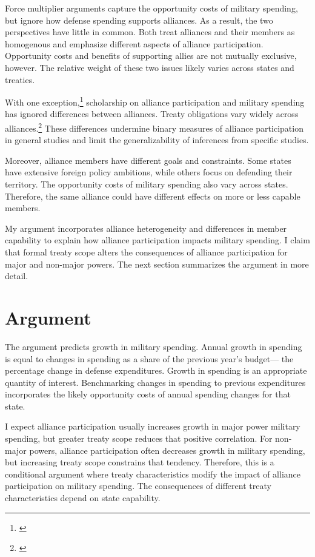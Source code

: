 \documentclass[12pt]{article}
\begin{document}
Force multiplier arguments capture the opportunity costs of military spending, but ignore how defense spending supports alliances. 
As a result, the two perspectives have little in common. 
Both treat alliances and their members as homogenous and emphasize different aspects of alliance participation. 
Opportunity costs and benefits of supporting allies are not mutually exclusive, however. 
The relative weight of these two issues likely varies across states and treaties. 


With one exception,\footnote{\cite{DigiuseppePoast2016}} scholarship on alliance participation and military spending has ignored differences between alliances.
Treaty obligations vary widely across alliances.\footnote{\cite{Leedsetal2002}}
These differences undermine binary measures of alliance participation in general studies and limit the generalizability of inferences from specific studies. 
 

Moreover, alliance members have different goals and constraints.
Some states have extensive foreign policy ambitions, while others focus on defending their territory. 
The opportunity costs of military spending also vary across states. 
Therefore, the same alliance could have different effects on more or less capable members. 


My argument incorporates alliance heterogeneity and differences in member capability to explain how alliance participation impacts military spending. 
I claim that formal treaty scope alters the consequences of alliance participation for major and non-major powers. 
The next section summarizes the argument in more detail. 



\section{Argument}

The argument predicts growth in military spending. 
Annual growth in spending is equal to changes in spending as a share of the previous year's budget--- the percentage change in defense expenditures. 
Growth in spending is an appropriate quantity of interest. 
Benchmarking changes in spending to previous expenditures incorporates the likely opportunity costs of annual spending changes for that state. 


I expect alliance participation usually increases growth in major power military spending, but greater treaty scope reduces that positive correlation. 
For non-major powers, alliance participation often decreases growth in military spending, but increasing treaty scope constrains that tendency. 
Therefore, this is a conditional argument where treaty characteristics modify the impact of alliance participation on military spending.
The consequences of different treaty characteristics depend on state capability.  
\end{document}
